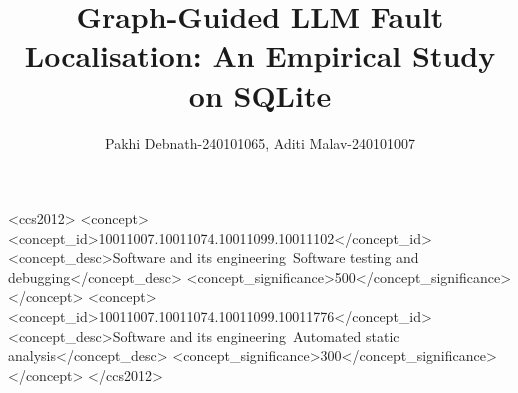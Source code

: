 \documentclass[acmsmall,screen,review]{acmart}
\begin{document}
\title[Graph-Guided LLM Fault Localisation]{Graph-Guided LLM Fault
  Localisation: An Empirical Study on SQLite}

\author{Pakhi Debnath-240101065, Aditi Malav-240101007}

\begin{abstract}

\end{abstract}

\begin{CCSXML}
<ccs2012>
  <concept>
    <concept_id>10011007.10011074.10011099.10011102</concept_id>
    <concept_desc>Software and its engineering~Software testing and debugging</concept_desc>
    <concept_significance>500</concept_significance>
  </concept>
  <concept>
    <concept_id>10011007.10011074.10011099.10011776</concept_id>
    <concept_desc>Software and its engineering~Automated static analysis</concept_desc>
    <concept_significance>300</concept_significance>
  </concept>
</ccs2012>
\end{CCSXML}


\maketitle














\end{document}
